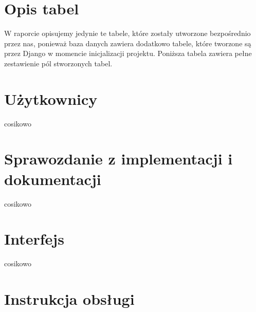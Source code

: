 \documentclass[a4paper]{article}
\begin{document}
\section{Opis tabel}
W raporcie opisujemy jedynie te tabele, które zostały utworzone bezpośrednio przez nas, ponieważ baza danych zawiera dodatkowo tabele, które tworzone są przez Django w momencie inicjalizacji projektu. Poniższa tabela zawiera pełne zestawienie pól stworzonych tabel.



\section{Użytkownicy}
cosikowo
\section{Sprawozdanie z implementacji i dokumentacji}
cosikowo
\section{Interfejs}
cosikowo
\section{Instrukcja obsługi}

\end{document}
